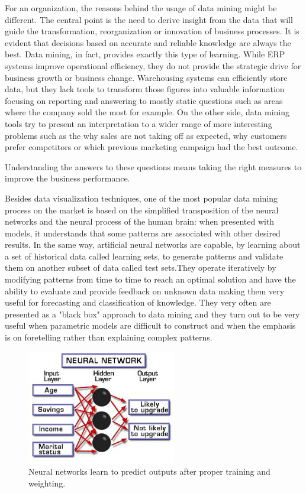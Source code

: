 For an organization, the reasons behind the usage of data mining might be different.
The central point is the need to derive insight from the data that will guide the transformation, reorganization or innovation of business processes.
It is evident that decisions based on accurate and reliable knowledge are always the best. Data mining, in fact, provides exactly this type of learning.
While ERP systems improve operational efficiency, they do not provide the strategic drive for business growth or business change. Warehousing systems can efficiently store data, but they lack tools to transform those figures into valuable information focusing on reporting and answering to mostly static questions such as areas where the company sold the most for example. On the other side, data mining tools try to present an interpretation to a wider range of more interesting problems such as the why sales are not taking off as expected, why customers prefer competitors or which previous marketing campaign had the best outcome.

Understanding the answers to these questions means taking the right measures to improve the business performance.
 
Besides data visualization techniques, one of the most popular data mining process on the market is based on the simplified transposition of the neural networks and the neural process of the human brain: when presented with models, it understands that some patterns are associated with other desired results. In the same way, artificial neural networks are capable, by learning about a set of historical data called learning sets, to generate patterns and validate them on another subset of data called test sets.They operate iteratively by modifying patterns from time to time to reach an optimal solution and have the ability to evaluate and provide feedback on unknown data making them very useful for forecasting and classification of knowledge. They very often are presented as a "black box" approach to data mining and they turn out to be very useful when parametric models are difficult to construct and when the emphasis is on foretelling rather than explaining complex patterns.


\vspace{0.5cm}
\begin{figure}[htbp]
  \centering
    \includegraphics[height=5cm]{images/neural}
  \caption{Neural networks learn to predict outputs after proper training and weighting.}
  \label{fig:neural}
\end{figure}
\vspace{0.5cm}


